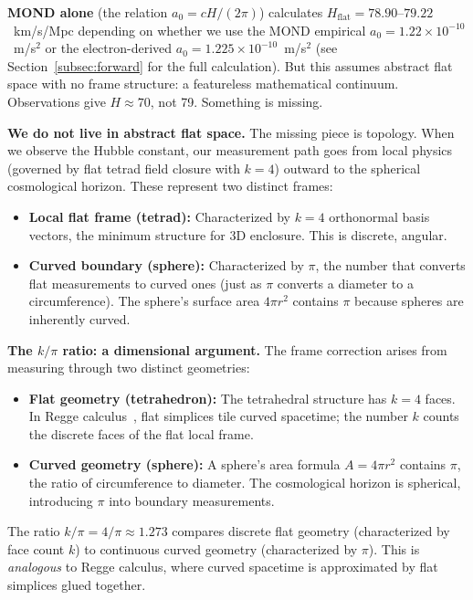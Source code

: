 \documentclass[aps,prd,preprint,superscriptaddress,showpacs,preprintnumbers,amsmath,amssymb,nofootinbib]{revtex4-2}
\begin{document}
\textbf{MOND alone} (the relation $a_0 = cH/(2\pi)$) calculates $H_{\text{flat}} = 78.90$--$79.22$~km/s/Mpc depending on whether we use the MOND empirical $a_0 = 1.22 \times 10^{-10}$~m/s$^2$ or the electron-derived $a_0 = 1.225 \times 10^{-10}$~m/s$^2$ (see Section~\ref{subsec:forward} for the full calculation). But this assumes abstract flat space with no frame structure: a featureless mathematical continuum. Observations give $H \approx 70$, not 79. Something is missing.

\textbf{We do not live in abstract flat space.} The missing piece is topology. When we observe the Hubble constant, our measurement path goes from local physics (governed by flat tetrad field closure with $k=4$) outward to the spherical cosmological horizon. These represent two distinct frames:

\begin{itemize}
\item \textbf{Local flat frame (tetrad):} Characterized by $k=4$ orthonormal basis vectors, the minimum structure for 3D enclosure. This is discrete, angular.
\item \textbf{Curved boundary (sphere):} Characterized by $\pi$, the number that converts flat measurements to curved ones (just as $\pi$ converts a diameter to a circumference). The sphere's surface area $4\pi r^2$ contains $\pi$ because spheres are inherently curved.
\end{itemize}

\textbf{The $k/\pi$ ratio: a dimensional argument.} The frame correction arises from measuring through two distinct geometries:
\begin{itemize}
\item \textbf{Flat geometry (tetrahedron):} The tetrahedral structure has $k=4$ faces. In Regge calculus~\cite{regge1961}, flat simplices tile curved spacetime; the number $k$ counts the discrete faces of the flat local frame.
\item \textbf{Curved geometry (sphere):} A sphere's area formula $A = 4\pi r^2$ contains $\pi$, the ratio of circumference to diameter. The cosmological horizon is spherical, introducing $\pi$ into boundary measurements.
\end{itemize}
The ratio $k/\pi = 4/\pi \approx 1.273$ compares discrete flat geometry (characterized by face count $k$) to continuous curved geometry (characterized by $\pi$). This is \emph{analogous} to Regge calculus, where curved spacetime is approximated by flat simplices glued together.
\end{document}
